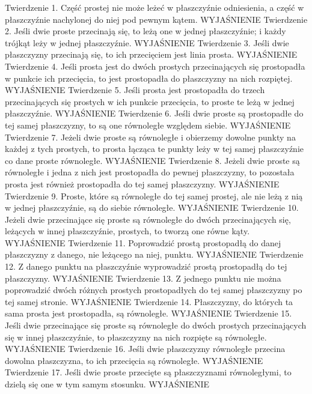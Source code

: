 Twierdzenie 1.
    Część prostej nie może leżeć w płaszczyźnie odniesienia, a część w płaszczyźnie nachylonej do niej pod pewnym kątem.
    WYJAŚNIENIE
Twierdzenie 2.
    Jeśli dwie proste przecinają się, to leżą one w jednej płaszczyźnie; i każdy trójkąt leży w jednej płaszczyźnie.
    WYJAŚNIENIE
Twierdzenie 3.
    Jeśli dwie płaszczyzny przecinają się, to ich przecięciem jest linia prosta.
    WYJAŚNIENIE
Twierdzenie 4.
    Jeśli prosta jest do dwóch prostych przecinających się prostopadła w punkcie ich przecięcia, to jest prostopadła do płaszczyzny na nich rozpiętej.
    WYJAŚNIENIE
Twierdzenie 5.
    Jeśli prosta jest prostopadła do trzech przecinających się prostych w ich punkcie przecięcia, to proste te leżą w jednej płaszczyźnie.
    WYJAŚNIENIE
Twierdzenie 6.
    Jeśli dwie proste są prostopadłe do tej samej płaszczyzny, to są one równoległe względem siebie.
    WYJAŚNIENIE
Twierdzenie 7.
    Jeżeli dwie proste są równoległe i obierzemy dowolne punkty na każdej z tych prostych, to prosta łącząca te punkty leży w tej samej płaszczyźnie co dane proste równoległe.
    WYJAŚNIENIE
Twierdzenie 8.
    Jeżeli dwie proste są równoległe i jedna z nich jest prostopadła do pewnej płaszczyzny, to pozostała prosta jest również prostopadła do tej samej płaszczyzny.
    WYJAŚNIENIE
Twierdzenie 9.
    Proste, które są równoległe do tej samej prostej, ale nie leżą z nią w jednej płaszczyźnie, są do siebie równoległe.
    WYJAŚNIENIE
Twierdzenie 10.
    Jeżeli dwie przecinające się proste są równoległe do dwóch przecinających się, leżących w innej płaszczyźnie, prostych, to tworzą one równe kąty.
    WYJAŚNIENIE
Twierdzenie 11.
    Poprowadzić prostą prostopadłą do danej płaszczyzny z danego, nie leżącego na niej, punktu.
    WYJAŚNIENIE
Twierdzenie 12.
    Z danego punktu na płaszczyźnie wyprowadzić prostą prostopadłą do tej płaszczyzny.
    WYJAŚNIENIE
Twierdzenie 13.
    Z jednego punktu nie można poprowadzić dwóch różnych prostych prostopadłych do tej samej płaszczyzny po tej samej stronie.
    WYJAŚNIENIE
Twierdzenie 14.
    Płaszczyzny, do których ta sama prosta jest prostopadła, są równoległe.
    WYJAŚNIENIE
Twierdzenie 15.
    Jeśli dwie przecinające się proste są równoległe do dwóch prostych przecinających się w innej płaszczyźnie, to płaszczyzny na nich rozpięte są równoległe.
    WYJAŚNIENIE
Twierdzenie 16.
    Jeśli dwie płaszczyzny równoległe przecina dowolna płaszczyzna, to ich przecięcia są równoległe.
    WYJAŚNIENIE
Twierdzenie 17.
    Jeśli dwie proste przecięte są płaszczyznami równoległymi, to dzielą się one w tym samym stosunku.
    WYJAŚNIENIE
